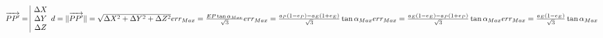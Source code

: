 \documentclass{article}
\begin{document}
\begin{math}
$$\overrightarrow{PP'} =
\begin{array}{|ccc|}
\Delta X\\
\Delta Y\\
\Delta Z\\
\end{array}
$$
\\
\\
$$d = \|\overrightarrow{PP'}\| = \sqrt{\Delta X^2+\Delta Y^2+\Delta Z^2}$$
\\
\\
err_{Max}=\frac{EP\tan{\alpha_{Max}}}{\sqrt{3}}
\\
\\
err_{Max}=\frac{a_{P}(1-e_{P}) - a_{E}(1+e_{E})}{\sqrt{3}}\tan{\alpha_{Max}}
\\
\\
err_{Max}=\frac{a_{E}(1-e_{E}) - a_{P}(1+e_{P})}{\sqrt{3}}\tan{\alpha_{Max}}
\\
\\
err_{Max}=\frac{a_{E}(1-e_{E})}{\sqrt{3}}\tan{\alpha_{Max}}
\end{math}
\end{document}
